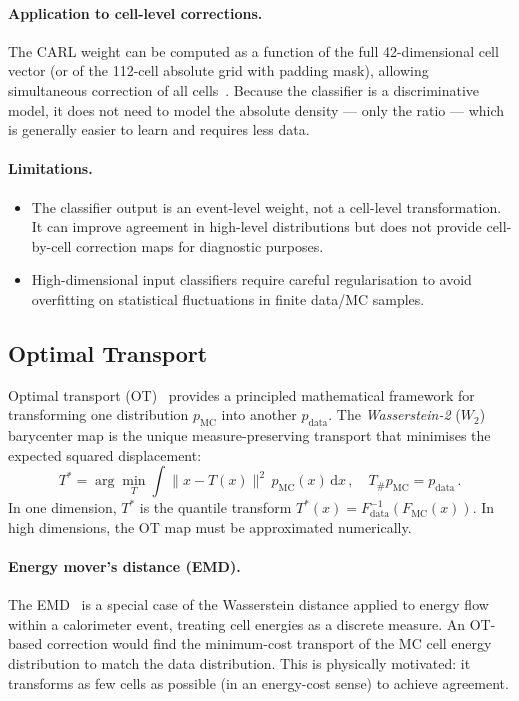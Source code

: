 \documentclass[11pt,a4paper]{article}
\begin{document}
\paragraph{Application to cell-level corrections.}
The CARL weight can be computed as a function of the full
42-dimensional cell vector (or of the 112-cell absolute grid with
padding mask), allowing simultaneous correction of all
cells~\cite{Rizvi:2023}.  Because the classifier is a discriminative
model, it does not need to model the absolute density — only the
ratio — which is generally easier to learn and requires less data.

\paragraph{Limitations.}
\begin{itemize}
  \item The classifier output is an event-level weight, not a cell-level
        transformation.  It can improve agreement in high-level
        distributions but does not provide cell-by-cell correction maps
        for diagnostic purposes.
  \item High-dimensional input classifiers require careful regularisation
        to avoid overfitting on statistical fluctuations in finite
        data/MC samples.
\end{itemize}

\subsection{Optimal Transport}
\label{sec:alternatives:ot}

Optimal transport (OT)~\cite{Villani:2009,Peyre:2019} provides a
principled mathematical framework for transforming one
distribution $p_\mathrm{MC}$ into another $p_\mathrm{data}$.
The \emph{Wasserstein-2} ($W_2$) barycenter map is the unique
measure-preserving transport that minimises the expected squared
displacement:
\begin{equation}
  T^* = \arg\min_T \int \|x - T(x)\|^2 \, p_\mathrm{MC}(x)\,
        \mathrm{d}x\,,
  \quad
  T_\# p_\mathrm{MC} = p_\mathrm{data}\,.
  \label{eq:ot:w2}
\end{equation}
In one dimension, $T^*$ is the quantile transform $T^*(x) =
F_\mathrm{data}^{-1}(F_\mathrm{MC}(x))$.  In high dimensions,
the OT map must be approximated numerically.

\paragraph{Energy mover's distance (EMD).}
The EMD~\cite{Komiske:2019} is a special case of the Wasserstein
distance applied to energy flow within a calorimeter event,
treating cell energies as a discrete measure.  An OT-based correction
would find the minimum-cost transport of the MC cell energy
distribution to match the data distribution.  This is physically
motivated: it transforms as few cells as possible (in an energy-cost
sense) to achieve agreement.
\end{document}
